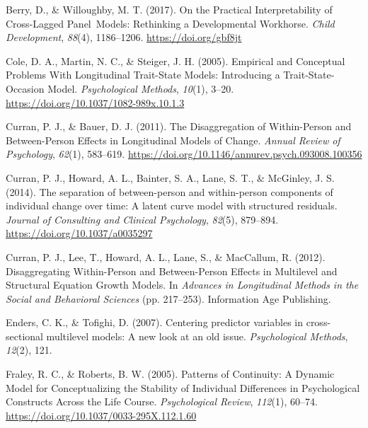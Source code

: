 \documentclass[
  english,
  man,floatsintext]{apa6}
\newlength{\cslhangindent}
\newlength{\cslentryspacingunit} %
\newenvironment{CSLReferences}[2] %
 {%
  \setlength{\parindent}{0pt}
  \ifodd #1
  \let\oldpar\par
  \def\par{\hangindent=\cslhangindent\oldpar}
  \fi
  \setlength{\parskip}{#2\cslentryspacingunit}
 }%
 {}
\begin{document}
\hypertarget{refs}{}
\begin{CSLReferences}{1}{0}
\leavevmode{}%
Berry, D., \& Willoughby, M. T. (2017). On the {Practical Interpretability} of {Cross-Lagged Panel~Models}: {Rethinking} a {Developmental Workhorse}. \emph{Child Development}, \emph{88}(4), 1186--1206. \url{https://doi.org/gbf8jt}

\leavevmode{}%
Cole, D. A., Martin, N. C., \& Steiger, J. H. (2005). Empirical and {Conceptual Problems With Longitudinal Trait-State Models}: {Introducing} a {Trait-State-Occasion Model}. \emph{Psychological Methods}, \emph{10}(1), 3--20. \url{https://doi.org/10.1037/1082-989x.10.1.3}

\leavevmode{}%
Curran, P. J., \& Bauer, D. J. (2011). The {Disaggregation} of {Within-Person} and {Between-Person Effects} in {Longitudinal Models} of {Change}. \emph{Annual Review of Psychology}, \emph{62}(1), 583--619. \url{https://doi.org/10.1146/annurev.psych.093008.100356}

\leavevmode{}%
Curran, P. J., Howard, A. L., Bainter, S. A., Lane, S. T., \& McGinley, J. S. (2014). The separation of between-person and within-person components of individual change over time: {A} latent curve model with structured residuals. \emph{Journal of Consulting and Clinical Psychology}, \emph{82}(5), 879--894. \url{https://doi.org/10.1037/a0035297}

\leavevmode{}%
Curran, P. J., Lee, T., Howard, A. L., Lane, S., \& MacCallum, R. (2012). Disaggregating {Within-Person} and {Between-Person Effects} in {Multilevel} and {Structural Equation Growth Models}. In \emph{Advances in {Longitudinal Methods} in the {Social} and {Behavioral Sciences}} (pp. 217--253). {Information Age Publishing}.

\leavevmode{}%
Enders, C. K., \& Tofighi, D. (2007). Centering predictor variables in cross-sectional multilevel models: {A} new look at an old issue. \emph{Psychological Methods}, \emph{12}(2), 121.

\leavevmode{}%
Fraley, R. C., \& Roberts, B. W. (2005). Patterns of {Continuity}: {A Dynamic Model} for {Conceptualizing} the {Stability} of {Individual Differences} in {Psychological Constructs Across} the {Life Course}. \emph{Psychological Review}, \emph{112}(1), 60--74. \url{https://doi.org/10.1037/0033-295X.112.1.60}


\end{CSLReferences}
\end{document}
